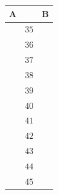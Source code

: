 \begin{problem}
\begin{center}
\begin{tabular}{p{3.5cm}|c|p{3.5cm}}
\multicolumn{1}{c|}{A} & & \multicolumn{1}{c}{B} \\
\hline
 & \(35\) & \\
 & \(36\) & \\
 & \(37\) & \\
 & \(38\) & \\
 & \(39\) & \\
 & \(40\) & \\
 & \(41\) & \\
 & \(42\) & \\
 & \(43\) & \\
 & \(44\) & \\
 & \(45\) & \\
\end{tabular}
\end{center}
\end{problem}

